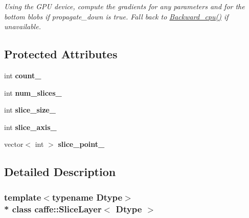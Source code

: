 \begin{DoxyCompactItemize}
\begin{DoxyCompactList}\small\item\em Using the G\+PU device, compute the gradients for any parameters and for the bottom blobs if propagate\+\_\+down is true. Fall back to \hyperlink{classcaffe_1_1SliceLayer_a47020470cc88b5a55c7d137ac2beca45}{Backward\+\_\+cpu()} if unavailable. \end{DoxyCompactList}\end{DoxyCompactItemize}
\subsection*{Protected Attributes}
\begin{DoxyCompactItemize}
\item 
int {\bfseries count\+\_\+}\hypertarget{classcaffe_1_1SliceLayer_ad5f5a2a02b1f5b97b4ec8e1a2588b094}{}\label{classcaffe_1_1SliceLayer_ad5f5a2a02b1f5b97b4ec8e1a2588b094}

\item 
int {\bfseries num\+\_\+slices\+\_\+}\hypertarget{classcaffe_1_1SliceLayer_adddb440fcfcad67619a3cfb914298e73}{}\label{classcaffe_1_1SliceLayer_adddb440fcfcad67619a3cfb914298e73}

\item 
int {\bfseries slice\+\_\+size\+\_\+}\hypertarget{classcaffe_1_1SliceLayer_a8d12bb77a960c76b9f521c3df70fb206}{}\label{classcaffe_1_1SliceLayer_a8d12bb77a960c76b9f521c3df70fb206}

\item 
int {\bfseries slice\+\_\+axis\+\_\+}\hypertarget{classcaffe_1_1SliceLayer_a214fca5452dfa0bc63d3e51c0b9118ea}{}\label{classcaffe_1_1SliceLayer_a214fca5452dfa0bc63d3e51c0b9118ea}

\item 
vector$<$ int $>$ {\bfseries slice\+\_\+point\+\_\+}\hypertarget{classcaffe_1_1SliceLayer_a9c87893378e2c87f3382fae63f18f300}{}\label{classcaffe_1_1SliceLayer_a9c87893378e2c87f3382fae63f18f300}

\end{DoxyCompactItemize}


\subsection{Detailed Description}
\subsubsection*{template$<$typename Dtype$>$\\*
class caffe\+::\+Slice\+Layer$<$ Dtype $>$}

